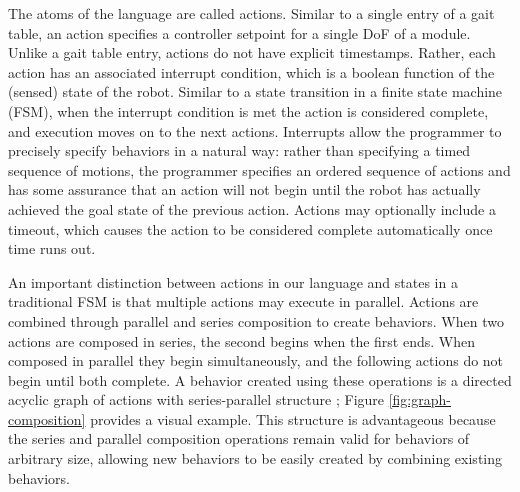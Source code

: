 \documentclass[graybox]{svmult}
\begin{document}
%    

 The atoms of the language are called actions.  Similar to a single entry of a gait
table, an action specifies a controller setpoint for a single DoF of a module.  Unlike
a gait table entry, actions do not have explicit timestamps.  Rather, each action has an associated
interrupt condition, which is a boolean function of the (sensed) state of the robot. Similar
to a state transition in a finite state machine (FSM), when the interrupt condition is met the action is  considered
complete, and  execution moves on to the next actions.  Interrupts allow the programmer
to precisely specify behaviors in a natural way: rather than specifying a timed sequence
of motions, the programmer specifies an ordered sequence of actions and has some
assurance that an action will not begin until the robot has actually achieved the goal
state of the previous action. Actions
may optionally include a timeout, which causes the action to be considered complete
automatically once time runs out.

An important distinction between actions in our language and states in a traditional
FSM is that multiple actions may execute in parallel.   Actions are combined through
parallel and series composition to create behaviors. When two actions are composed in series,
the second begins when the first ends. When composed in parallel they
begin simultaneously, and the following actions do not begin until both complete.
A behavior created using these operations is a directed acyclic graph of actions with
series-parallel structure \cite{valdes1979recognition};  Figure \ref{fig:graph-composition} provides
a visual example. This structure is advantageous because the
 series and parallel composition operations   
remain valid for behaviors of arbitrary size, allowing new behaviors to be easily
created by combining existing behaviors.
 
\end{document}
